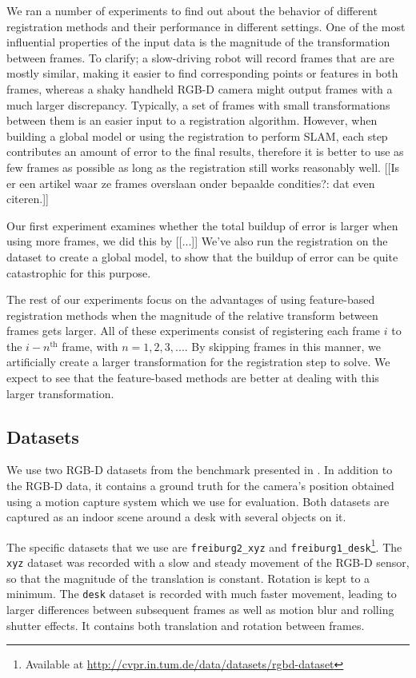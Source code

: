 \documentclass[a4paper]{article}
\begin{document}
We ran a number of experiments to find out about the behavior of different registration methods and their performance in different settings. One of the most influential properties of the input data is the magnitude of the transformation between frames. To clarify; a slow-driving robot will record frames that are are mostly similar, making it easier to find corresponding points or features in both frames, whereas a shaky handheld RGB-D camera might output frames with a much larger discrepancy. Typically, a set of frames with small transformations between them is an easier input to a registration algorithm. However, when building a global model or using the registration to perform SLAM, each step contributes an amount of error to the final results, therefore it is better to use as few frames as possible as long as the registration still works reasonably well. [[Is er een artikel waar ze frames overslaan onder bepaalde condities?: dat even citeren.]]

Our first experiment examines whether the total buildup of error is larger when using more frames, we did this by [[...]] We've also run the registration on the dataset to create a global model, to show that the buildup of error can be quite catastrophic for this purpose.

The rest of our experiments focus on the advantages of using feature-based registration methods when the magnitude of the relative transform between frames gets larger. All of these experiments consist of registering each frame $i$ to the $i-n^{\mathrm{th}}$ frame, with $n = 1,2,3,...$. By skipping frames in this manner, we artificially create a larger transformation for the registration step to solve. We expect to see that the feature-based methods are better at dealing with this larger transformation.

\subsection{Datasets}

We use two RGB-D datasets from the benchmark presented in \cite{sturm11rss-rgbd}. In addition to the RGB-D data, it contains a ground truth for the camera's position obtained using a motion capture system which we use for evaluation. Both datasets are captured as an indoor scene around a desk with several objects on it.

The specific datasets that we use are \texttt{freiburg2\_xyz} and \texttt{freiburg1\_desk}\footnote{Available at \url{http://cvpr.in.tum.de/data/datasets/rgbd-dataset}}. The \texttt{xyz} dataset was recorded with a slow and steady movement of the RGB-D sensor, so that the magnitude of the translation is constant. Rotation is kept to a minimum. The \texttt{desk} dataset is recorded with much faster movement, leading to larger differences between subsequent frames as well as motion blur and rolling shutter effects. It contains both translation and rotation between frames.
\end{document}
